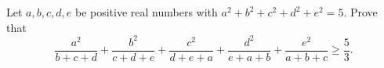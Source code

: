 Let $a,b,c,d,e$ be positive real numbers with $a^2+b^2+c^2+d^2+e^2=5$. Prove that
\[\dfrac{a^2}{b+c+d}+\dfrac{b^2}{c+d+e}+\dfrac{c^2}{d+e+a}+\dfrac{d^2}{e+a+b}+\dfrac{e^2}{a+b+c}\ge\dfrac{5}{3}.\]
